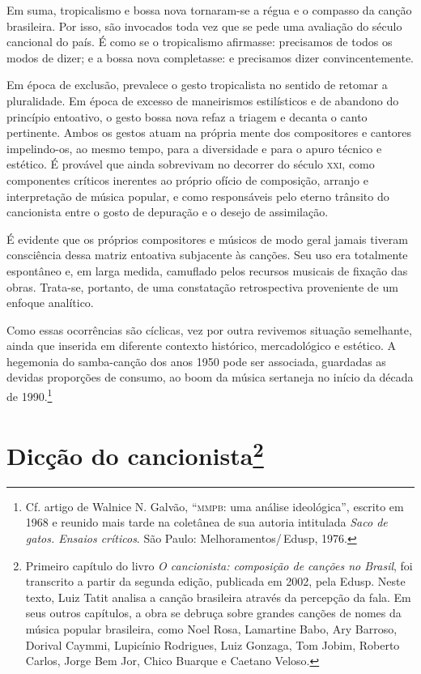 Em suma, tropicalismo e bossa nova tornaram-se a régua e o compasso da
canção brasileira. Por isso, são invocados toda vez que se pede uma
avaliação do século cancional do país. É como se o tropicalismo
afirmasse: precisamos de todos os modos de dizer; e a bossa nova
completasse: e precisamos dizer convincentemente. 

Em época de exclusão, prevalece o gesto tropicalista no sentido de retomar a pluralidade. Em
época de excesso de maneirismos estilísticos e de abandono do princípio
entoativo, o gesto bossa nova refaz a triagem e decanta o canto
pertinente. Ambos os gestos atuam na própria mente dos compositores e
cantores impelindo-os, ao mesmo tempo, para a diversidade e para o apuro
técnico e estético. É provável que ainda sobrevivam no decorrer do
século \textsc{xxi}, como componentes críticos inerentes ao próprio ofício de
composição, arranjo e interpretação de música popular, e como
responsáveis pelo eterno trânsito do cancionista entre o gosto de
depuração e o desejo de assimilação.

É evidente que os próprios compositores e músicos de modo geral
jamais tiveram consciência dessa matriz entoativa subjacente às canções.
Seu uso era totalmente espontâneo e, em larga medida, camuflado pelos
recursos musicais de fixação das obras. Trata-se, portanto, de uma
constatação retrospectiva proveniente de um enfoque analítico.

Como essas ocorrências são cíclicas, vez por outra revivemos
situação semelhante, ainda que inserida em diferente contexto histórico,
mercadológico e estético. A hegemonia do samba-canção dos anos 1950 pode
ser associada, guardadas as devidas proporções de consumo, ao boom da
música sertaneja no início da década de 1990.\footnote{Cf. artigo de Walnice N. Galvão, ``\textsc{mmpb}: uma análise ideológica'', escrito em 1968 e reunido mais tarde na coletânea de sua autoria intitulada \textit{Saco de gatos. Ensaios críticos}. São Paulo: Melhoramentos/\,Edusp, 1976.}

\chapter{Dicção do cancionista\footnote{Primeiro capítulo do livro \textit{O cancionista: composição de canções no Brasil}, foi transcrito a partir da segunda edição, publicada em 2002, pela Edusp. Neste texto, Luiz Tatit analisa a canção brasileira através da percepção da fala. Em seus outros capítulos, a obra se debruça sobre grandes canções de nomes da música popular brasileira, como Noel Rosa, Lamartine Babo, Ary Barroso, Dorival Caymmi, Lupicínio Rodrigues, Luiz Gonzaga, Tom Jobim, Roberto Carlos, Jorge Bem Jor, Chico Buarque e Caetano Veloso.}}

